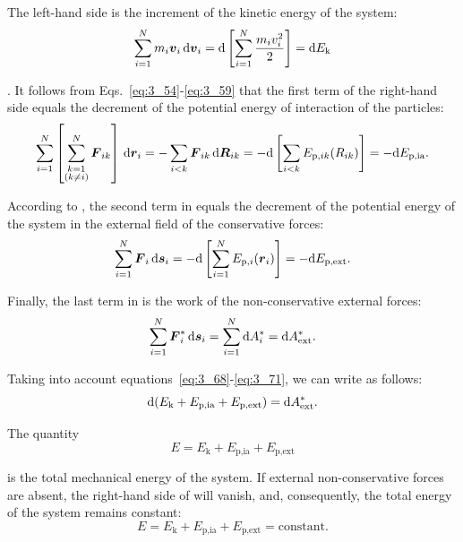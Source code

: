 \noindent
The left-hand side is the increment of the kinetic energy of the system:
\begin{equation}\label{eq:3_68}
\sum_{i=1}^{N} m_i\boldsymbol{v}_i\,\mathrm{d}\boldsymbol{v}_i = \mathrm{d}\left[\sum_{i=1}^{N} \frac{m_iv_i^2}{2}\right] = \mathrm{d} E_{\text{k}}
\end{equation}

. It follows from Eqs.~\eqref{eq:3_54}-\eqref{eq:3_59} that the first term of the right-hand side equals the decrement of the potential energy of interaction of the particles:
\begin{equation}\label{eq:3_69}
\sum_{i=1}^{N}\left[\sum_{\substack{k=1\\(k\neq i)}}^{N} \boldsymbol{F}_{ik}\right]\,\mathrm{d}\boldsymbol{r}_i = - \sum_{i<k}\boldsymbol{F}_{ik}\,\mathrm{d}\boldsymbol{R}_{ik} = -\mathrm{d}\left[\sum_{i<k} E_{\text{p},ik}(R_{ik})\right] = -\mathrm{d} E_{\text{p,ia}}.
\end{equation}

\noindent
According to , the second term in  equals the decrement of the potential energy of the system in the external field of the conservative forces:
\begin{equation}\label{eq:3_70}
\sum_{i=1}^{N}\boldsymbol{F}_i\,\mathrm{d}\boldsymbol{s}_i = -\mathrm{d}\left[\sum_{i=1}^{N}E_{\text{p},i}(\boldsymbol{r}_i)\right] = -\mathrm{d} E_{\text{p,ext}}.
\end{equation}

\noindent
Finally, the last term in  is the work of the non-conservative external forces:
\begin{equation}\label{eq:3_71}
\sum_{i=1}^{N}\boldsymbol{F}_i^*\,\mathrm{d}\boldsymbol{s}_i = \sum_{i=1}^{N} \mathrm{d} A_i^* = \mathrm{d} A^*_{\text{ext}}.
\end{equation}

\noindent
Taking into account equations~\eqref{eq:3_68}-\eqref{eq:3_71}, we can write  as follows:
\begin{equation}\label{eq:3_72}
\mathrm{d}(E_{\text{k}} + E_{\text{p,ia}} + E_{\text{p,ext}}) = \mathrm{d} A^*_{\text{ext}}.
\end{equation}

The quantity
\begin{equation}\label{eq:3_73}
E = E_{\text{k}} + E_{\text{p,ia}} + E_{\text{p,ext}}
\end{equation}

\noindent
is the total mechanical energy of the system. If external non-conservative forces are absent, the right-hand side of  will vanish, and, consequently, the total energy of the system remains constant:
\begin{equation}\label{eq:3_74}
E = E_{\text{k}} + E_{\text{p,ia}} + E_{\text{p,ext}} = \text{constant}.
\end{equation}

